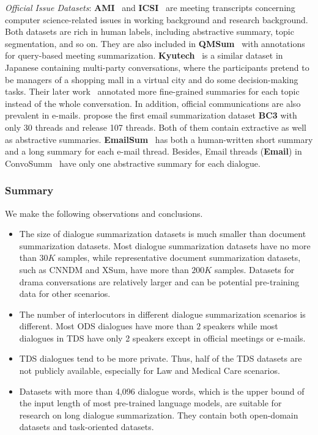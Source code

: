 \textit{Official Issue Datasets}: \textbf{AMI}~\cite{carletta2005ami} and \textbf{ICSI}~\cite{janin2003icsi} are meeting transcripts concerning 
computer science-related issues in working background and research background. Both datasets are rich in human labels, including abstractive summary, topic segmentation, and so on. They are also included in \textbf{QMSum}~\cite{zhong2021qmsum} with annotations for query-based meeting summarization. \textbf{Kyutech}~\cite{yamamura2016kyutech} is a similar dataset in Japanese containing multi-party conversations, where the participants pretend to be managers of a shopping mall in a virtual city and do some decision-making tasks. Their later work~\cite{nakayama2021corpus} annotated more fine-grained summaries for each topic instead of the whole conversation.
In addition, official communications are also prevalent in e-mails. 
\citet{ulrich2008publicly} propose the first email summarization dataset \textbf{BC3} with only 30 threads and \citet{loza2014email} release 107 threads. Both of them contain extractive as well as abstractive summaries.
\textbf{EmailSum}~\cite{zhang2021emailsum} has both a human-written short summary and a long summary for each e-mail thread. 
Besides, Email threads (\textbf{Email}) in ConvoSumm~\cite{fabbri2021convosumm} have only one abstractive summary for each dialogue.


\subsubsection{Summary}
We make the following observations and conclusions.
\begin{itemize}
	\item The size of dialogue summarization datasets is much smaller than document summarization datasets. Most dialogue summarization datasets have no more than $30K$ samples, while representative document summarization datasets, such as CNNDM and XSum, have more than $200K$ samples. Datasets for drama conversations are relatively larger and can be potential pre-training data for other scenarios. 
	\item The number of interlocutors in different dialogue summarization scenarios is different. Most ODS dialogues have more than $2$ speakers while 
most dialogues in TDS have only 2 speakers except in official meetings or 
e-mails.
	\item TDS dialogues tend to be more private. Thus, half of the 
TDS datasets are not publicly available, especially for Law and 
Medical Care scenarios. 
	\item Datasets with more than 4,096 dialogue words, which is the upper bound of the input length of most pre-trained language models, are suitable for research on long dialogue summarization. They contain both open-domain datasets and task-oriented datasets. 

\end{itemize} 
 


